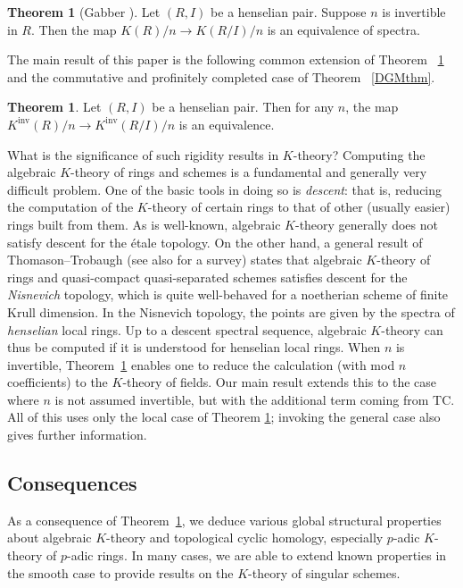 \documentclass{amsart}
\newcommand{\knf}{K^{\mathrm{inv}}}
\theoremstyle{definition}
\newtheorem{theorem}[definition]{Theorem}
\newtheorem{thm}{Theorem}
\newcommand{\TC}{\mathrm{TC}}
\begin{document}
\begin{theorem}[Gabber \cite{gabber}] 
\label{gabberthm}
Let $(R, I)$ be a henselian pair. Suppose $n$ is invertible in $R$. Then the map
$K(R)/n \to K(R/I)/n$ is an equivalence of spectra. 
\end{theorem} 



The main result of this paper is the following common extension of Theorem
~\ref{gabberthm} and the commutative and profinitely completed case of Theorem ~\ref{DGMthm}.
	
\begin{thm} 
\label{ourthm}
Let $(R, I)$ be a henselian pair. Then for any $n$, the map
$\knf(R)/n \to \knf(R/I)/n$ is an equivalence.  
\end{thm} 




What is the significance of such rigidity results in $K$-theory? 
Computing the algebraic $K$-theory of rings and schemes is a fundamental and
generally very difficult problem. 
One of the basic tools in doing so is \emph{descent}: that is, reducing the
computation of 
the $K$-theory of certain rings to that of other (usually easier) rings built
from them.  As is well-known, algebraic $K$-theory generally does not
satisfy descent for the \'etale topology.  
On the other hand, 
a general result of Thomason--Trobaugh \cite{TT90} (see also
\cite{ThomasonICM} for a survey) states that
algebraic $K$-theory of rings and quasi-compact quasi-separated schemes satisfies
descent for the \emph{Nisnevich} topology, which is quite well-behaved for a
noetherian scheme of finite Krull dimension. 
In the Nisnevich topology, the points are given by the spectra of
\emph{henselian}
local rings. Up to a descent spectral sequence, algebraic $K$-theory can thus
be computed if it is understood for henselian local rings.
When $n$ is invertible, 
Theorem~\ref{gabberthm} enables one to reduce the calculation (with mod $n$
coefficients) to the $K$-theory
of fields.  Our main result extends this to the case where $n$ is not assumed invertible, but with the additional term coming from $\TC$.  All of this uses only the local case of Theorem \ref{ourthm}; invoking the general case also gives further information.


\subsection{Consequences}
As a consequence of Theorem~\ref{ourthm}, we deduce various global structural properties about algebraic
$K$-theory and topological cyclic homology, 
especially $p$-adic $K$-theory of $p$-adic rings. 
In many cases, we are able to extend known properties in the smooth case to
provide results on the $K$-theory of singular schemes. 
\end{document}
